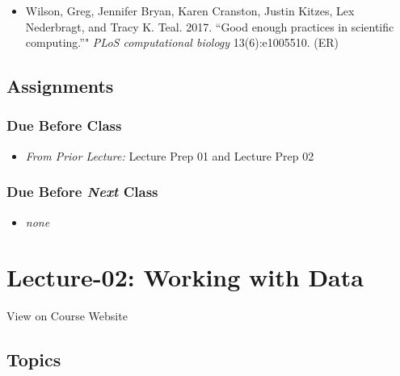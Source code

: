 \documentclass[]{book}
\providecommand{\tightlist}{%
  \setlength{\itemsep}{0pt}\setlength{\parskip}{0pt}}
\theoremstyle{definition}
\theoremstyle{definition}
\theoremstyle{definition}
\theoremstyle{remark}
\begin{document}
\begin{itemize}
\tightlist
\item
  Wilson, Greg, Jennifer Bryan, Karen Cranston, Justin Kitzes, Lex
  Nederbragt, and Tracy K. Teal. 2017. ``Good enough practices in
  scientific computing.''" \emph{PLoS computational biology}
  13(6):e1005510. (ER)
\end{itemize}

\hypertarget{assignments-2}{%
\subsection*{Assignments}\label{assignments-2}}

\hypertarget{due-before-class}{%
\subsubsection*{Due Before Class}\label{due-before-class}}

\begin{itemize}
\tightlist
\item
  \emph{From Prior Lecture:} Lecture Prep 01 and Lecture Prep 02
\end{itemize}

\hypertarget{due-before-next-class-1}{%
\subsubsection*{\texorpdfstring{Due Before \emph{Next}
Class}{Due Before Next Class}}\label{due-before-next-class-1}}

\begin{itemize}
\tightlist
\item
  \emph{none}
\end{itemize}

\hypertarget{lecture-02-working-with-data}{%
\section*{Lecture-02: Working with
Data}\label{lecture-02-working-with-data}}

View on Course Website

\hypertarget{topics-2}{%
\subsection*{Topics}\label{topics-2}}
\end{document}
